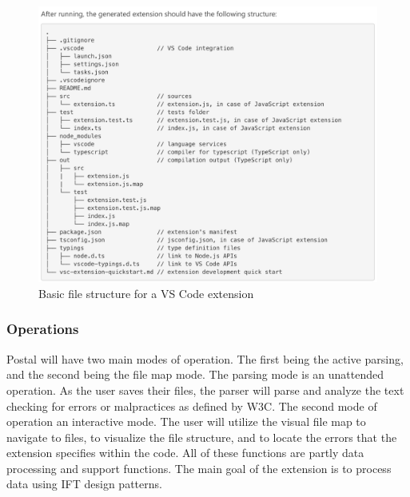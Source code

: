 \documentclass[letterpaper,10pt,titlepage,draftclsnofoot,onecolumn,onesided] {IEEEtran}
\begin{document}
\begin{figure}
\centering
\includegraphics[scale=0.5]{fileStructure.png}
\caption{Basic file structure for a VS Code extension}
\end{figure}

\subsubsection{Operations}
Postal will have two main modes of operation.
The first being the active parsing, and the second being the file map mode.
The parsing mode is an unattended operation. As the user saves their files, the parser will parse and analyze the text checking for errors or malpractices as defined by W3C.
The second mode of operation an interactive mode. The user will utilize the visual file map to navigate to files, to visualize the file structure, and to locate the errors that the extension specifies within the code. 
All of these functions are partly data processing and support functions. 
The main goal of the extension is to process data using IFT design patterns.
\end{document}
